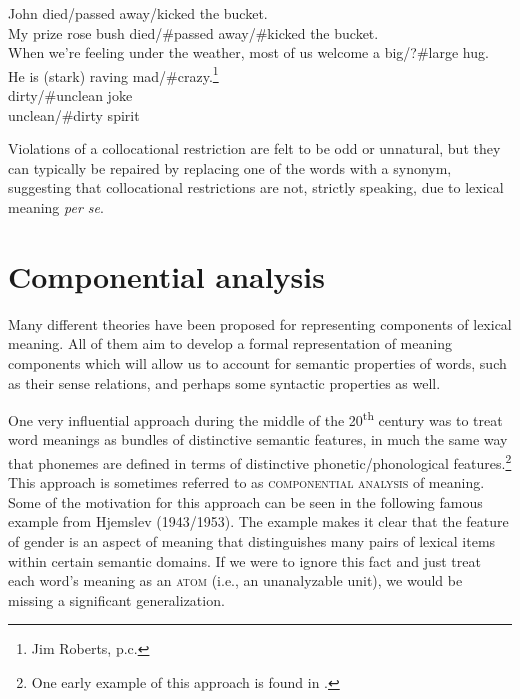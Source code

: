 \ea \label{ex:7.15}
\ea John died/passed away/kicked the bucket.\\
\ex My prize rose bush died/\#passed away/\#kicked the bucket.\\
\ex When we’re feeling under the weather, most of us welcome a big/?\#large hug.\\
\ex He is (stark) raving mad/\#crazy.\footnote{Jim Roberts, p.c.}\\
\ex dirty/\#unclean joke\\
\ex unclean/\#dirty spirit
                       \z
\z


Violations of a collocational restriction are felt to be odd or unnatural, but they can typically be repaired by replacing one of the words with a synonym, suggesting that collocational restrictions are not, strictly speaking, due to lexical meaning \textit{per se}.


\section{Componential analysis}\label{sec:7.4}

Many different theories have been proposed for representing components of lexical meaning. All of them aim to develop a formal representation of meaning components which will allow us to account for semantic properties of words, such as their sense relations, and perhaps some syntactic properties as well.



One very influential approach during the middle of the 20\textsuperscript{th} century was to treat word meanings as bundles of distinctive semantic features, in much the same way that phonemes are defined in terms of distinctive phonetic/phonological features.\footnote{One early example of this approach is found in \citet{Nida1951}.} This approach is sometimes referred to as \textsc{componential analysis} of meaning. Some of the motivation for this approach can be seen in the following famous example from Hjemslev (1943/1953). The example makes it clear that the feature of gender is an aspect of meaning that distinguishes many pairs of lexical items within certain semantic domains. If we were to ignore this fact and just treat each word’s meaning as an \textsc{atom} (i.e., an unanalyzable unit), we would be missing a significant generalization.



